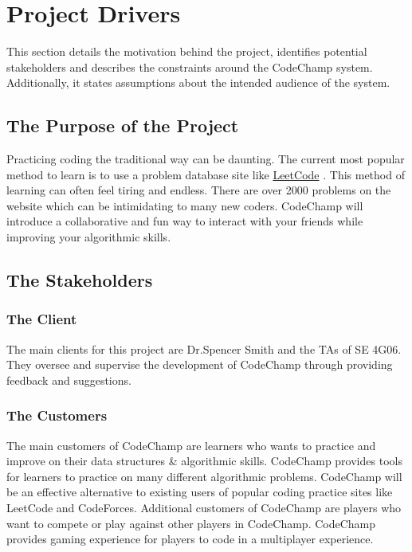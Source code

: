 \documentclass[12pt, titlepage]{article}
\begin{document}




\section{Project Drivers}

This section details the motivation behind the project, identifies potential stakeholders and describes the constraints around the CodeChamp system. Additionally, it states assumptions about the intended audience of the system.

\subsection{The Purpose of the Project}

Practicing coding the traditional way can be daunting. The current most popular method to learn is to use a problem database site like \href{http://www.leetcode.com}{LeetCode} \cite{leetcode}. This method of learning can often feel tiring and endless. There are over 2000 problems on the website which can be intimidating to many new coders. CodeChamp will introduce a collaborative and fun way to interact with your friends while improving your algorithmic skills.

\subsection{The Stakeholders}

\subsubsection{The Client}
The main clients for this project are Dr.Spencer Smith and the TAs of SE 4G06. They oversee and supervise the development of CodeChamp through providing feedback and suggestions.

\subsubsection{The Customers}
The main customers of CodeChamp are learners who wants to practice and improve on their data structures \& algorithmic skills. CodeChamp provides tools for learners to practice on many different algorithmic problems. CodeChamp will be an effective alternative to existing users of popular coding practice sites like LeetCode and CodeForces. Additional customers of CodeChamp are players who want to compete or play against other players in CodeChamp. CodeChamp provides gaming experience for players to code in a multiplayer experience.
\end{document}
